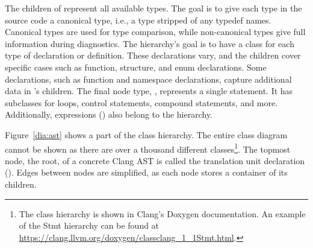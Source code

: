 The children of  represent all available types.
The goal is to give each type in the source code a canonical type,
i.e., a type stripped of any typedef names. 
Canonical types are used for type comparison, while non-canonical 
types give full information during diagnostics. 
The  hierarchy's goal is to have a class for each 
type of declaration or definition. 
These declarations vary, and the children cover specific cases 
such as function, structure, and enum declarations. 
Some declarations, such as function and namespace declarations, 
capture additional data in 's children. 
The final node type, , represents a single statement. 
It has subclasses for loops, control statements, compound statements, 
and more. 
Additionally, expressions () also belong 
to the  hierarchy.

Figure~\ref{dia:ast} shows a part of the class hierarchy. 
The entire class diagram cannot be shown as there are over a thousand 
different classes\footnote{The class hierarchy is shown in Clang's
Doxygen documentation. An example of the Stmt hierarchy can be found
at \url{https://clang.llvm.org/doxygen/classclang_1_1Stmt.html}.}. 
The topmost node, the root, of a concrete Clang AST is called the translation
unit declaration (). 
Edges between nodes are simplified, as each node stores 
a container of its children.

